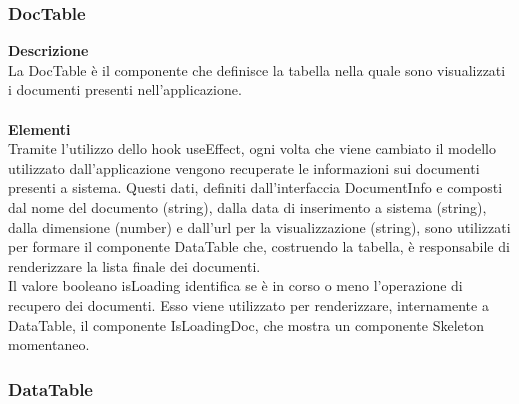 \subsubsection{DocTable}

\textbf{Descrizione}\\
La DocTable è il componente che definisce la tabella nella quale sono visualizzati i documenti presenti nell'applicazione.\\ \\
\textbf{Elementi}\\
Tramite l'utilizzo dello hook useEffect, ogni volta che viene cambiato il modello utilizzato dall'applicazione vengono recuperate le informazioni sui documenti presenti a sistema. Questi dati, definiti dall'interfaccia DocumentInfo e composti dal nome del documento (string), dalla data di inserimento a sistema (string), dalla dimensione (number) e dall'url per la visualizzazione (string), sono utilizzati per formare il componente DataTable che, costruendo la tabella, è responsabile di renderizzare la lista finale dei documenti.\\
Il valore booleano isLoading identifica se è in corso o meno l'operazione di recupero dei documenti. Esso viene utilizzato per renderizzare, internamente a DataTable, il componente IsLoadingDoc, che mostra un componente Skeleton momentaneo.

\subsubsection{DataTable}

